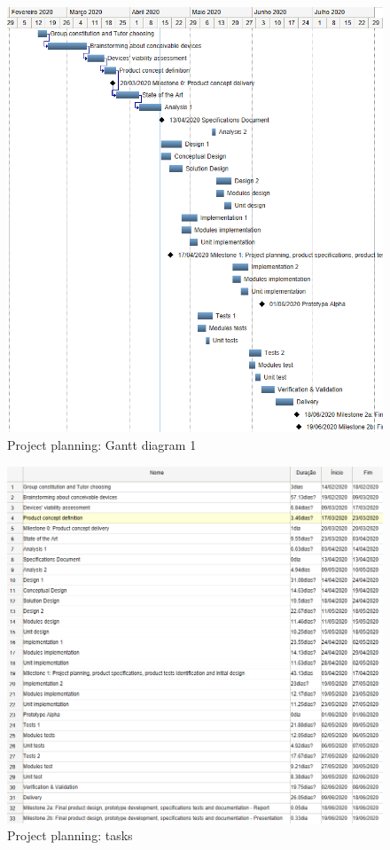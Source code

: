 \begin{figure}[!htbp]
\centering
\includegraphics[width=1.0\textwidth]{./sec/img/gantt-diag-orig.png}
\caption{\label{fig:gantt-diag2}Project planning: Gantt diagram 1}
\end{figure}
\begin{figure}[!htbp]
\centering
\includegraphics[width=1.0\textwidth]{./sec/img/gantt-orig-tasks.png}
\caption{\label{fig:gantt-tasks}Project planning: tasks}
\end{figure}
